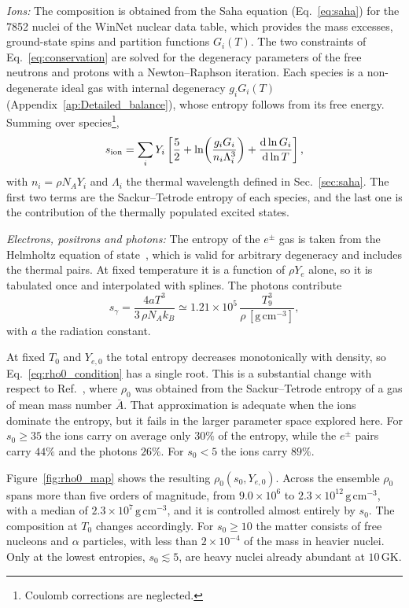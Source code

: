 \textit{Ions:}
The composition is obtained from the Saha equation (Eq.~\ref{eq:saha}) for the 7852 nuclei of the WinNet nuclear data table, which provides the mass excesses, ground-state spins and partition functions $G_i(T)$.
The two constraints of Eq.~\ref{eq:conservation} are solved for the degeneracy parameters of the free neutrons and protons with a Newton--Raphson iteration.
Each species is a non-degenerate ideal gas with internal degeneracy $g_iG_i(T)$ (Appendix~\ref{ap:Detailed_balance}), whose entropy follows from its free energy.
Summing over species\footnote{Coulomb corrections are neglected.},
\begin{equation}\label{eq:s_ion}
  s_{\rm ion}=\sum_iY_i\left[\frac52+\ln\!\left(\frac{g_iG_i}{n_i\Lambda_i^3}\right)+\frac{\mathrm{d}\ln G_i}{\mathrm{d}\ln T}\right],
\end{equation}
with $n_i=\rho N_AY_i$ and $\Lambda_i$ the thermal wavelength defined in Sec.~\ref{sec:saha}.
The first two terms are the Sackur--Tetrode entropy of each species, and the last one is the contribution of the thermally populated excited states.

\textit{Electrons, positrons and photons:}
The entropy of the $e^\pm$ gas is taken from the Helmholtz equation of state~\cite{timmes_accuracy_2000}, which is valid for arbitrary degeneracy and includes the thermal pairs.
At fixed temperature it is a function of $\rho Y_e$ alone, so it is tabulated once and interpolated with splines.
The photons contribute
\begin{equation}\label{eq:s_gamma}
  s_\gamma=\frac{4aT^3}{3\,\rho N_Ak_B}\simeq1.21\times10^{5}\,\frac{T_9^{3}}{\rho\,[\mathrm{g\,cm^{-3}}]},
\end{equation}
with $a$ the radiation constant.

At fixed $T_0$ and $Y_{e,0}$ the total entropy decreases monotonically with density, so Eq.~\ref{eq:rho0_condition} has a single root.
This is a substantial change with respect to Ref.~\cite{hernandez_porras_features_2027}, where $\rho_0$ was obtained from the Sackur--Tetrode entropy of a gas of mean mass number $\bar A$.
That approximation is adequate when the ions dominate the entropy, but it fails in the larger parameter space explored here.
For $s_0\geq35$ the ions carry on average only $30\%$ of the entropy, while the $e^\pm$ pairs carry $44\%$ and the photons $26\%$.
For $s_0<5$ the ions carry $89\%$.

Figure~\ref{fig:rho0_map} shows the resulting $\rho_0(s_0,Y_{e,0})$.
Across the ensemble $\rho_0$ spans more than five orders of magnitude, from $9.0\times10^{6}$ to $2.3\times10^{12}\,\mathrm{g\,cm^{-3}}$, with a median of $2.3\times10^{7}\,\mathrm{g\,cm^{-3}}$, and it is controlled almost entirely by $s_0$.
The composition at $T_0$ changes accordingly.
For $s_0\geq10$ the matter consists of free nucleons and $\alpha$ particles, with less than $2\times10^{-4}$ of the mass in heavier nuclei.
Only at the lowest entropies, $s_0\lesssim5$, are heavy nuclei already abundant at $10\,\mathrm{GK}$.


